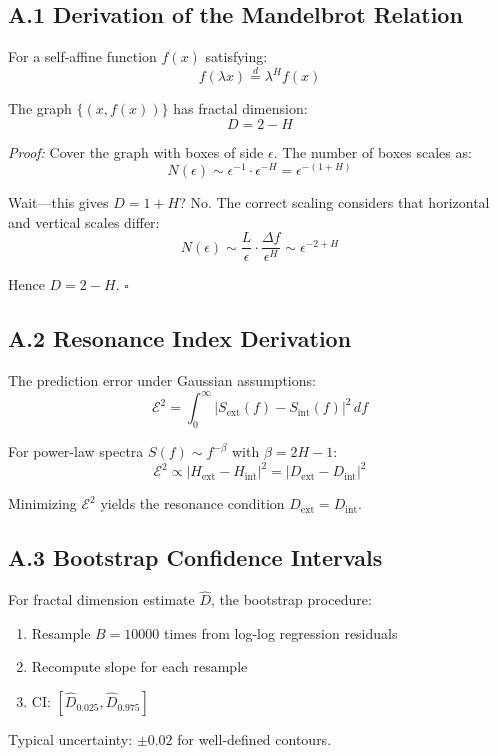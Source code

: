 \documentclass[11pt,a4paper]{article}
\begin{document}
\subsection{A.1 Derivation of the Mandelbrot Relation}

For a self-affine function $f(x)$ satisfying:
\begin{equation}
f(\lambda x) \stackrel{d}{=} \lambda^H f(x)
\end{equation}

The graph $\{(x, f(x))\}$ has fractal dimension:
\begin{equation}
D = 2 - H
\end{equation}

\textit{Proof:} Cover the graph with boxes of side $\epsilon$. The number of boxes scales as:
\begin{equation}
N(\epsilon) \sim \epsilon^{-1} \cdot \epsilon^{-H} = \epsilon^{-(1+H)}
\end{equation}

Wait---this gives $D = 1 + H$? No. The correct scaling considers that horizontal and vertical scales differ:
\begin{equation}
N(\epsilon) \sim \frac{L}{\epsilon} \cdot \frac{\Delta f}{\epsilon^H} \sim \epsilon^{-2+H}
\end{equation}

Hence $D = 2 - H$. $\square$

\subsection{A.2 Resonance Index Derivation}

The prediction error under Gaussian assumptions:
\begin{equation}
\mathcal{E}^2 = \int_0^\infty |S_{\text{ext}}(f) - S_{\text{int}}(f)|^2 \, df
\end{equation}

For power-law spectra $S(f) \sim f^{-\beta}$ with $\beta = 2H - 1$:
\begin{equation}
\mathcal{E}^2 \propto |H_{\text{ext}} - H_{\text{int}}|^2 = |D_{\text{ext}} - D_{\text{int}}|^2
\end{equation}

Minimizing $\mathcal{E}^2$ yields the resonance condition $D_{\text{ext}} = D_{\text{int}}$.

\subsection{A.3 Bootstrap Confidence Intervals}

For fractal dimension estimate $\hat{D}$, the bootstrap procedure:
\begin{enumerate}
    \item Resample $B = 10000$ times from log-log regression residuals
    \item Recompute slope for each resample
    \item CI: $[\hat{D}_{0.025}, \hat{D}_{0.975}]$
\end{enumerate}

Typical uncertainty: $\pm 0.02$ for well-defined contours.
\end{document}
